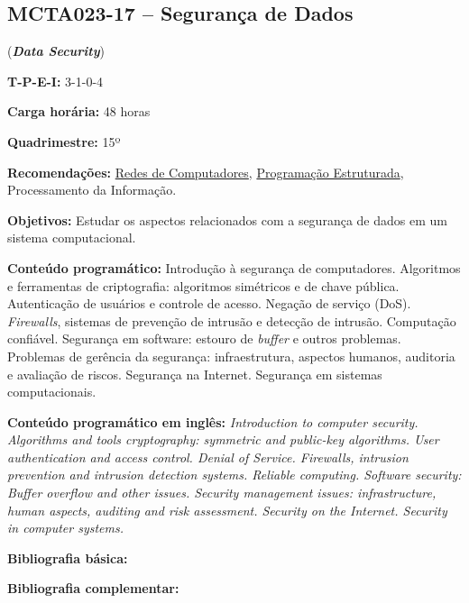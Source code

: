 \documentclass[12pt,a4paper]{article}
\begin{document}
\subsection*{MCTA023-17 -- Segurança de Dados}
\label{disc:seg}

(\textbf{\textit{Data Security}})

\begin{center}
    \begin{minipage}{0.85\textwidth}
    
        \textbf{T-P-E-I:} 3-1-0-4
        
        \textbf{Carga horária:} 48 horas
        
        \textbf{Quadrimestre:} 15º
        
        \textbf{Recomendações:} 
        \hyperref[disc:redes]{Redes de Computadores},
        \hyperref[disc:pe]{Programação Estruturada},
        Processamento da Informação.        
    \end{minipage}
\end{center}

\textbf{Objetivos:}
Estudar os aspectos relacionados com a segurança de dados em um sistema
computacional.

\textbf{Conteúdo programático:}
Introdução à segurança de computadores.
Algoritmos e ferramentas de criptografia: algoritmos simétricos e de chave pública.
Autenticação de usuários e controle de acesso.
Negação de serviço (DoS).
\textit{Firewalls}, sistemas de prevenção de intrusão e detecção de intrusão.
Computação confiável.
Segurança em software: estouro de \textit{buffer} e outros problemas.
Problemas de gerência da segurança: infraestrutura, aspectos humanos, auditoria
e avaliação de riscos. 
Segurança na Internet. Segurança em sistemas computacionais.

\textbf{Conteúdo programático em inglês:}
\textit{Introduction to computer security. 
Algorithms and tools cryptography: symmetric and public-key algorithms. 
User authentication and access control.
Denial of Service. 
Firewalls, intrusion prevention and intrusion detection systems. 
Reliable computing. 
Software security: Buffer overflow and other issues. 
Security management issues: infrastructure, human aspects, auditing and risk assessment. 
Security on the Internet. Security in computer systems.}

\newrefsection
\textbf{Bibliografia básica:}
\nocite{2013-goodrich-tamassia, 2008-stallings, 2007-nakamura-geus} 
\printbibliography

\newrefsection
\textbf{Bibliografia complementar:}
\nocite{2007-konheim, 1996-schneier, 2011-stamp, 2017-correia-sousa, 2005-cheswick-etal}
\printbibliography
\end{document}
